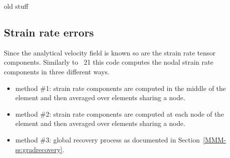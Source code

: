 \newpage



{\large old stuff}





































\newpage

\subsection*{Strain rate errors}

Since the analytical velocity field is known so are the strain rate tensor components.
Similarly to \stone~21 this code computes the nodal strain rate components
in three different ways. 
\begin{itemize}
\item method \#1: strain rate components are computed in the middle of the element and then averaged over elements sharing a node.
\item method \#2: strain rate components are computed at each node of the element and then averaged over elements sharing a node.
\item method \#3: global recovery process as documented in Section~\ref{MMM-ss:gradrecovery}.
\end{itemize}

